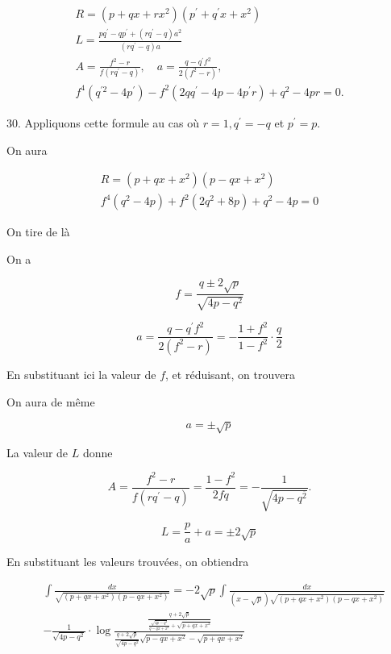 \documentclass{article}
\begin{document}
\[
\begin{gathered}
R=\left(p+q x+r x^{2}\right)\left(p^{\prime}+q^{\prime} x+x^{2}\right) \\
L=\frac{p q^{\prime}-q p^{\prime}+\left(r q^{\prime}-q\right) a^{2}}{\left(r q^{\prime}-q\right) a} \\
A=\frac{f^{2}-r}{f\left(r q^{\prime}-q\right)}, \quad a=\frac{q-q^{\prime} f^{2}}{2\left(f^{2}-r\right)}, \\
f^{4}\left(q^{\prime 2}-4 p^{\prime}\right)-f^{2}\left(2 q q^{\prime}-4 p-4 p^{\prime} r\right)+q^{2}-4 p r=0 .
\end{gathered}
\]

30. Appliquons cette formule au cas où \(r=1, q^{\prime}=-q\) et \(p^{\prime}=p\).

On aura

\[
\begin{gathered}
R=\left(p+q x+x^{2}\right)\left(p-q x+x^{2}\right) \\
f^{4}\left(q^{2}-4 p\right)+f^{2}\left(2 q^{2}+8 p\right)+q^{2}-4 p=0
\end{gathered}
\]

On tire de là

On a

\[
f=\frac{q \pm 2 \sqrt{p}}{\sqrt{4 p-q^{2}}}
\]

\[
a=\frac{q-q^{\prime} f^{2}}{2\left(f^{2}-r\right)}=-\frac{1+f^{2}}{1-f^{2}} \cdot \frac{q}{2}
\]

En substituant ici la valeur de \(f\), et réduisant, on trouvera

On aura de même

\[
a= \pm \sqrt{p}
\]

La valeur de \(L\) donne

\[
A=\frac{f^{2}-r}{f\left(r q^{\prime}-q\right)}=\frac{1-f^{2}}{2 f q}=-\frac{1}{\sqrt{4 p-q^{\overline{2}}}} .
\]

\[
L=\frac{p}{a}+a= \pm 2 \sqrt{p}
\]

En substituant les valeurs trouvées, on obtiendra

\[
\begin{aligned}
& \int \frac{d x}{\sqrt{\left(p+q x+x^{2}\right)\left(p-q x+x^{2}\right)}}=-2 \sqrt{p} \int \frac{d x}{(x-\sqrt{p}) \sqrt{\left(p+q x+x^{2}\right)\left(p-q x+x^{2}\right)}} \\
&-\frac{1}{\sqrt{4 p-q^{2}}} \cdot \log \frac{\frac{q+2 \sqrt{p}}{\frac{\sqrt{4 p-q^{2}}}{q-q x+x^{2}}+\sqrt{p+q x+x^{2}}}}{\frac{q+2 \sqrt{p}}{\sqrt{4 p-q^{2}}} \sqrt{p-q x+x^{2}}-\sqrt{p+q x+x^{2}}}
\end{aligned}
\]
\end{document}
